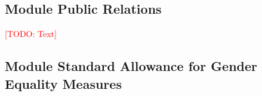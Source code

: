 \documentclass[american,firsttime]{dfgproposal}
\newcommand{\todo}[1]{\xspace{\textcolor{red}{[TODO: #1]}}\xspace}
\begin{document}
	\subsection{Module Public Relations}
	\todo{Text}
	
	\subsection{Module Standard Allowance for Gender Equality Measures}
	
	
	
	
	
	
\end{document}
